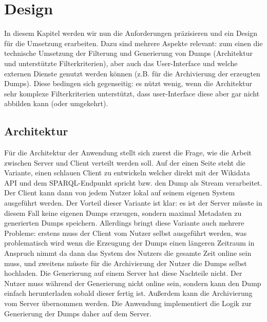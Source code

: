 \chapter{Design}
\label{chap:design}

In diesem Kapitel werden wir nun die Anforderungen präzisieren und ein Design für die Umsetzung erarbeiten.
Dazu sind mehrere Aspekte relevant: zum einen die technische Umsetzung der Filterung und Generierung von Dumps (Architektur und unterstützte Filterkriterien), aber auch das User-Interface und welche externen Dienste genutzt werden können (z.B. für die Archivierung der erzeugten Dumps).
Diese bedingen sich gegenseitig: es nützt wenig, wenn die Architektur sehr komplexe Filterkriterien unterstützt, dass user-Interface diese aber gar nicht abbilden kann (oder umgekehrt).

\section{Architektur}
Für die Architektur der Anwendung stellt sich zuerst die Frage, wie die Arbeit zwischen Server und Client verteilt werden soll.
Auf der einen Seite steht die Variante, einen schlauen Client zu entwickeln welcher direkt mit der Wikidata API und dem SPARQL-Endpunkt spricht bzw. den Dump als Stream verarbeitet.
Der Client kann dann von jedem Nutzer lokal auf seinem eigenen System ausgeführt werden.
Der Vorteil dieser Variante ist klar: es ist der Server müsste in diesem Fall keine eigenen Dumps erzeugen, sondern maximal Metadaten zu generierten Dumps speichern.
Allerdings bringt diese Variante auch mehrere Probleme: erstens muss der Client vom Nutzer selbst ausgeführt werden, was problematisch wird wenn die Erzeugung der Dumps einen längeren Zeitraum in Anspruch nimmt da dann das System des Nutzers die gesamte Zeit online sein muss, und zweitens müsste für die Archivierung der Nutzer die Dumps selbst hochladen.
Die Generierung auf einem Server hat diese Nachteile nicht.
Der Nutzer muss während der Generierung nicht online sein, sondern kann den Dump einfach herunterladen sobald dieser fertig ist.
Außerdem kann die Archivierung vom Server übernommen werden.
Die Anwendung implementiert die Logik zur Generierung der Dumps daher auf dem Server.

